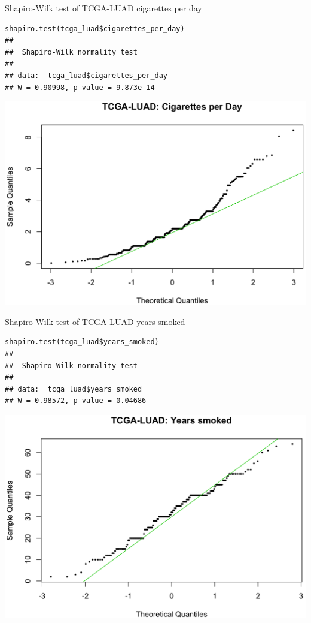 \documentclass[12pt, t, xcolor=dvipsnames]{beamer}
\begin{document}
\begin{frame}[fragile]{Shapiro-Wilk test of TCGA-LUAD cigarettes per day}
\begin{verbatim}
shapiro.test(tcga_luad$cigarettes_per_day)
## 
##  Shapiro-Wilk normality test
## 
## data:  tcga_luad$cigarettes_per_day
## W = 0.90998, p-value = 9.873e-14
\end{verbatim}
\includegraphics[height=0.6\textheight, keepaspectratio]{qqCpd}
\end{frame}


\begin{frame}[fragile]{Shapiro-Wilk test of TCGA-LUAD years smoked}
\begin{verbatim}
shapiro.test(tcga_luad$years_smoked)
## 
##  Shapiro-Wilk normality test
## 
## data:  tcga_luad$years_smoked
## W = 0.98572, p-value = 0.04686
\end{verbatim}
\includegraphics[height=0.6\textheight, keepaspectratio]{qqys}
\end{frame}
\end{document}
